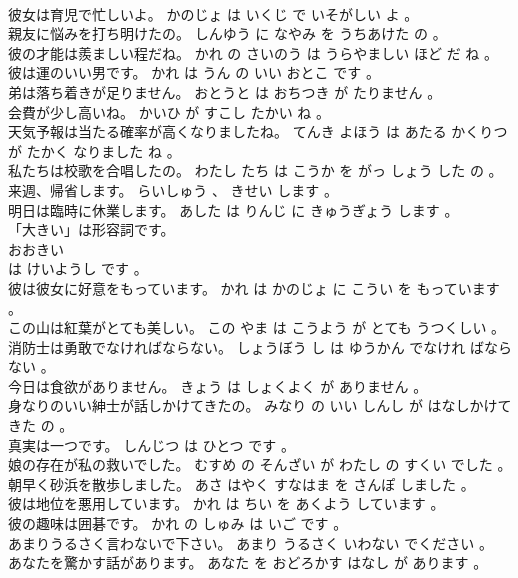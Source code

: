 \documentclass[8pt]{extreport}
\begin{document}
\begin{CJK}{UTF8}{min}
\\	彼女は育児で忙しいよ。	かのじょ は いくじ で いそがしい よ 。 
\\	親友に悩みを打ち明けたの。	しんゆう に なやみ を うちあけた の 。 
\\	彼の才能は羨ましい程だね。	かれ の さいのう は うらやましい ほど だ ね 。 
\\	彼は運のいい男です。	かれ は うん の いい おとこ です 。 
\\	弟は落ち着きが足りません。	おとうと は おちつき が たりません 。 
\\	会費が少し高いね。	かいひ が すこし たかい ね 。 
\\	天気予報は当たる確率が高くなりましたね。	てんき よほう は あたる かくりつ が たかく なりました ね 。 
\\	私たちは校歌を合唱したの。	わたし たち は こうか を がっ しょう した の 。 
\\	来週、帰省します。	らいしゅう 、 きせい します 。 
\\	明日は臨時に休業します。	あした は りんじ に きゅうぎょう します 。 
\\	「大きい」は形容詞です。	
\\	おおきい 
\\	は けいようし です 。 
\\	彼は彼女に好意をもっています。	かれ は かのじょ に こうい を もっています 。 
\\	この山は紅葉がとても美しい。	この やま は こうよう が とても うつくしい 。 
\\	消防士は勇敢でなければならない。	しょうぼう し は ゆうかん でなけれ ばならない 。 
\\	今日は食欲がありません。	きょう は しょくよく が ありません 。 
\\	身なりのいい紳士が話しかけてきたの。	みなり の いい しんし が はなしかけてきた の 。 
\\	真実は一つです。	しんじつ は ひとつ です 。 
\\	娘の存在が私の救いでした。	むすめ の そんざい が わたし の すくい でした 。 
\\	朝早く砂浜を散歩しました。	あさ はやく すなはま を さんぽ しました 。 
\\	彼は地位を悪用しています。	かれ は ちい を あくよう しています 。 
\\	彼の趣味は囲碁です。	かれ の しゅみ は いご です 。 
\\	あまりうるさく言わないで下さい。	あまり うるさく いわない でください 。 
\\	あなたを驚かす話があります。	あなた を おどろかす はなし が あります 。 

\end{CJK}
\end{document}
